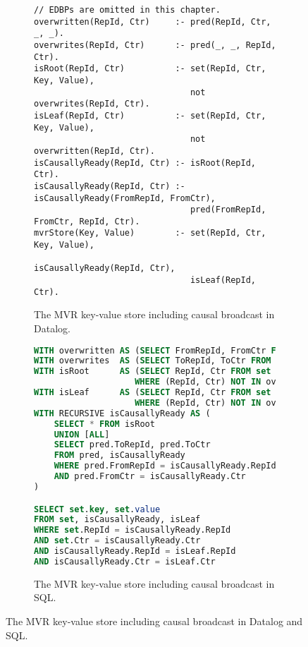 \begin{figure}[tpb]
    \begin{subfigure}[b]{\textwidth}
        \begin{lstlisting}[keepspaces]
// EDBPs are omitted in this chapter.
overwritten(RepId, Ctr)     :- pred(RepId, Ctr, _, _).
overwrites(RepId, Ctr)      :- pred(_, _, RepId, Ctr).
isRoot(RepId, Ctr)          :- set(RepId, Ctr, Key, Value),
                               not overwrites(RepId, Ctr).
isLeaf(RepId, Ctr)          :- set(RepId, Ctr, Key, Value),
                               not overwritten(RepId, Ctr).
isCausallyReady(RepId, Ctr) :- isRoot(RepId, Ctr).
isCausallyReady(RepId, Ctr) :- isCausallyReady(FromRepId, FromCtr),
                               pred(FromRepId, FromCtr, RepId, Ctr).
mvrStore(Key, Value)        :- set(RepId, Ctr, Key, Value),
                               isCausallyReady(RepId, Ctr),
                               isLeaf(RepId, Ctr).\end{lstlisting}
        \caption{The \ac{MVR} key-value store including causal broadcast in Datalog.}\label{code:mvr-crdt-datalog}
    \end{subfigure}

    \vspace{1em}

    \begin{subfigure}[b]{\textwidth}
        \begin{lstlisting}[language=SQL]
WITH overwritten AS (SELECT FromRepId, FromCtr FROM pred)
WITH overwrites  AS (SELECT ToRepId, ToCtr FROM pred)
WITH isRoot      AS (SELECT RepId, Ctr FROM set
                    WHERE (RepId, Ctr) NOT IN overwrites)
WITH isLeaf      AS (SELECT RepId, Ctr FROM set
                    WHERE (RepId, Ctr) NOT IN overwritten)
WITH RECURSIVE isCausallyReady AS (
    SELECT * FROM isRoot
    UNION [ALL]
    SELECT pred.ToRepId, pred.ToCtr
    FROM pred, isCausallyReady
    WHERE pred.FromRepId = isCausallyReady.RepId
    AND pred.FromCtr = isCausallyReady.Ctr
)

SELECT set.key, set.value
FROM set, isCausallyReady, isLeaf
WHERE set.RepId = isCausallyReady.RepId
AND set.Ctr = isCausallyReady.Ctr
AND isCausallyReady.RepId = isLeaf.RepId
AND isCausallyReady.Ctr = isLeaf.Ctr\end{lstlisting}
        \caption{The \ac{MVR} key-value store including causal broadcast in SQL.}\label{code:mvr-crdt-sql}
    \end{subfigure}

    \caption{The \ac{MVR} key-value store including causal broadcast in Datalog and SQL.}\label{code:mvr-crdt}
\end{figure}

